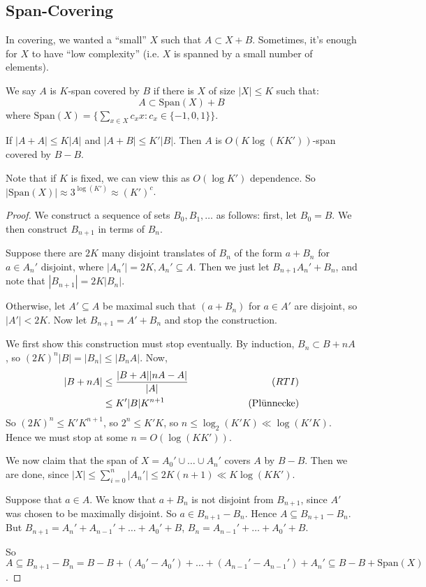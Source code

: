 \documentclass[10pt,a4paper]{article}
\begin{document}
\subsection{Span-Covering}
In covering, we wanted a ``small'' $X$ such that $A \subset X+B$. Sometimes, it's enough for $X$ to have ``low complexity'' (i.e. $X$ is spanned by a small number of elements).
\begin{definition}
  We say $A$ is $K$-span covered by $B$ if there is $X$ of size $|X| \leq K$ such that:
  \[A \subset \text{Span}(X) + B\]
  where $\text{Span}(X) = \{\sum_{x\in X}c_x x : c_x \in \{-1,0,1\}\}$.
\end{definition}
\begin{lemma}
  If $|A+A| \leq K|A|$ and $|A+B| \leq K'|B|$. Then $A$ is $O(K \log(KK'))$-span covered by $B-B$.
\end{lemma}
Note that if $K$ is fixed, we can view this as $O(\log K')$ dependence. So $|\text{Span}(X)| \approx 3^{\log(K')} \approx (K')^c$.
\begin{proof}
  We construct a sequence of sets $B_0, B_1, \ldots$ as follows: first, let $B_0 = B$. We then construct $B_{n+1}$ in terms of $B_n$.

  Suppose there are $2K$ many disjoint translates of $B_n$ of the form $a+B_n$ for $a \in A_n'$ disjoint, where $|A_n'| = 2K, A_n' \subseteq A$. Then we just let $B_{n+1}  A_n' + B_n$, and note that $|B_{n+1}| = 2K|B_n|$.

  Otherwise, let $A' \subseteq A$ be maximal such that $(a+B_n)$ for $a \in A'$ are disjoint, so $|A'| < 2K$. Now let $B_{n+1} = A' + B_n$ and stop the construction.

  We first show this construction must stop eventually. By induction, $B_n \subset B+nA$, so $(2K)^n|B| = |B_n| \leq |B_nA|$. Now,
  \begin{align*}
    |B+nA| &\leq \frac{|B+A||nA-A|}{|A|} \hspace*{3cm}(RTI)\\
    &\leq K'|B|K^{n+1} \hspace*{3cm}(\text{Pl\"unnecke})
  \end{align*}
  So $(2K)^n \leq K'K^{n+1}$, so $2^n \leq K'K$, so $n \leq \log_2(K'K)\ll \log(K' K)$. Hence we must stop at some $n = O(\log(KK'))$.

  We now claim that the span of $X = A_0' \cup \ldots \cup A_n'$ covers $A$ by $B-B$. Then we are done, since $|X|\leq \sum_{i=0}^n |A_n'| \leq 2K(n+1) \ll K \log(KK')$.

  Suppose that $a \in A$. We know that $a+B_n$ is not disjoint from $B_{n+1}$, since $A'$ was chosen to be maximally disjoint. So $a \in B_{n+1}-B_n$. Hence $A \subseteq B_{n+1} - B_n$. But $B_{n+1} = A_n' + A_{n-1}' + \ldots +A_0' + B$, $B_n = A_{n-1}' + \ldots +A_0'+B$.

  So $A \subseteq B_{n+1}-B_n = B-B + (A_0'-A_0') + \ldots +(A_{n-1}' -A_{n-1}') + A_n' \subseteq B-B + \text{Span}(X)$.
\end{proof}
\end{document}
